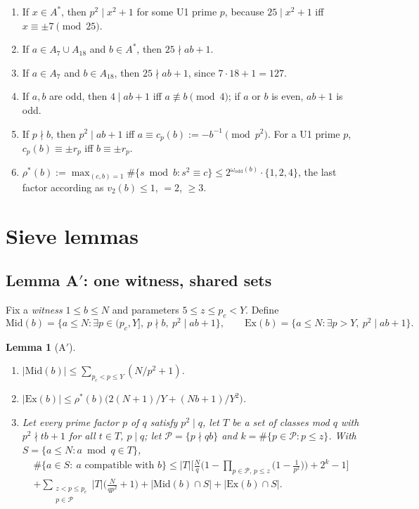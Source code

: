 \documentclass[11pt]{amsart}
\newtheorem{lemma}[theorem]{Lemma}
\theoremstyle{definition}
\theoremstyle{remark}
\newcommand{\Mid}{\mathrm{Mid}}
\newcommand{\Ex}{\mathrm{Ex}}
\begin{document}
\begin{enumerate}[label=(F\arabic*),leftmargin=*]
\item If $x\in A^*$, then $p^2\mid x^2+1$ for some U1 prime $p$, because
  $25\mid x^2+1$ iff $x\equiv\pm7\pmod{25}$.
\item If $a\in A_7\cup A_{18}$ and $b\in A^*$, then $25\nmid ab+1$.
\item If $a\in A_7$ and $b\in A_{18}$, then $25\nmid ab+1$, since $7\cdot18+1=127$.
\item If $a,b$ are odd, then $4\mid ab+1$ iff $a\not\equiv b\pmod4$; if $a$ or $b$
  is even, $ab+1$ is odd.
\item If $p\nmid b$, then $p^2\mid ab+1$ iff $a\equiv c_p(b):=-b^{-1}\pmod{p^2}$.
  For a U1 prime $p$, $c_p(b)\equiv\pm r_p$ iff $b\equiv\pm r_p$.
\item $\rho^*(b):=\max_{(c,b)=1}\#\{s\bmod b: s^2\equiv c\}\le
  2^{\omega_{\mathrm{odd}}(b)}\cdot\{1,2,4\}$, the last factor according as
  $v_2(b)\le1$, $=2$, $\ge3$.
\end{enumerate}

\section{Sieve lemmas}\label{sec:sieve}

\subsection{Lemma A$'$: one witness, shared sets}
Fix a \emph{witness} $1\le b\le N$ and parameters $5\le z\le p_c<Y$. Define
\[
  \Mid(b)=\{a\le N:\exists p\in(p_c,Y],\ p\nmid b,\ p^2\mid ab+1\},\qquad
  \Ex(b)=\{a\le N:\exists p>Y,\ p^2\mid ab+1\}.
\]

\begin{lemma}[A$'$]\label{lem:A}
\begin{enumerate}[label=(\roman*)]
\item $|\Mid(b)|\le\sum_{p_c<p\le Y}(N/p^2+1)$.
\item $|\Ex(b)|\le\rho^*(b)\big(2(N+1)/Y+(Nb+1)/Y^2\big)$.
\item Let every prime factor $p$ of $q$ satisfy $p^2\mid q$, let $T$ be a set of
  classes mod $q$ with $p^2\nmid tb+1$ for all $t\in T$, $p\mid q$; let
  $\mathcal P=\{p\nmid qb\}$ and $k=\#\{p\in\mathcal P: p\le z\}$. With
  $S=\{a\le N: a\bmod q\in T\}$,
  \begin{multline*}
  \#\{a\in S:\ a\text{ compatible with }b\}\le
  |T|\Big[\frac Nq\Big(1-\prod_{p\in\mathcal P,\,p\le z}\Big(1-\frac1{p^2}\Big)\Big)+2^k-1\Big]\\
  +\sum_{\substack{z<p\le p_c\\ p\in\mathcal P}}|T|\Big(\frac N{qp^2}+1\Big)
  +|\Mid(b)\cap S|+|\Ex(b)\cap S|.
  \end{multline*}
\end{enumerate}
\end{lemma}
\end{document}
